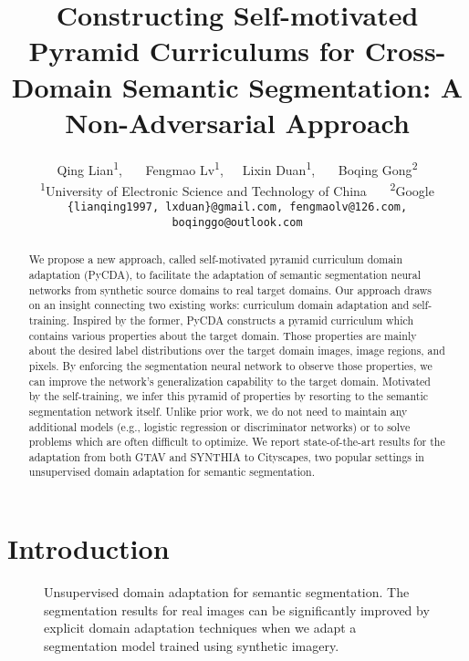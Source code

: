 \documentclass[10pt,twocolumn,letterpaper]{article}
\begin{document}
\title{Constructing Self-motivated Pyramid Curriculums for Cross-Domain Semantic Segmentation: A Non-Adversarial Approach}
\author{Qing Lian\textsuperscript{1},~~~  Fengmao Lv\textsuperscript{1},~~~Lixin Duan\textsuperscript{1},~~~ Boqing Gong\textsuperscript{2} \\
\textsuperscript{1}University of Electronic Science and Technology of China~~~ \textsuperscript{2}Google \\
{\tt\small \{lianqing1997, lxduan\}@gmail.com, fengmaolv@126.com, boqinggo@outlook.com}
}


\maketitle
\ificcvfinal\thispagestyle{empty}\fi

\begin{abstract}


We propose a new approach, called self-motivated pyramid curriculum domain adaptation (PyCDA), to facilitate the adaptation of semantic segmentation neural networks from synthetic source domains to real target domains. Our approach draws on an  insight connecting two existing works: curriculum domain adaptation and self-training. Inspired by the former, PyCDA constructs a pyramid curriculum which contains various properties about the target domain. Those properties are mainly about the desired label distributions over the target domain images, image regions, and pixels. By enforcing the segmentation neural network to observe those properties, we can improve the network's generalization capability to the target domain. Motivated by the self-training, we infer this pyramid of  properties  by resorting to the semantic segmentation network itself. Unlike  prior work, we do not need to maintain any additional models (e.g., logistic regression or discriminator networks) or to solve   problems which are often difficult to optimize. We report state-of-the-art results for the adaptation from both GTAV and SYNTHIA to Cityscapes, two popular settings in unsupervised domain adaptation for semantic segmentation.
\end{abstract}

\section{Introduction}

\begin{figure}\centering
{}\qquad
{}\vspace{-0.1cm}
\caption{Unsupervised domain adaptation for  semantic segmentation. The segmentation results for real images can be significantly improved by explicit domain adaptation techniques when we  adapt a segmentation model trained using synthetic imagery.}\label{fig:fig1}
\vspace{-0.5cm}
\end{figure}
\end{document}
